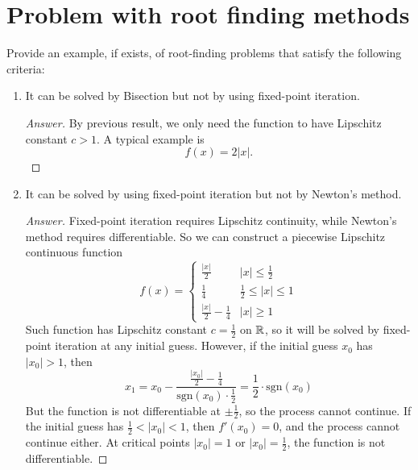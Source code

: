 


\section{Problem with root finding methods}
Provide an example, if exists, of root-finding problems that satisfy the following criteria:
\begin{enumerate}
	\item It can be solved by Bisection but not by using fixed-point iteration.
	\begin{proof}[Answer]
		By previous result, we only need the function to have Lipschitz constant \(c>1\).
		A typical example is
		\[ f(x)=2|x|. \]
	\end{proof}
	\item It can be solved by using fixed-point iteration but not by Newton's method.
	\begin{proof}[Answer]
		Fixed-point iteration requires Lipschitz continuity, while Newton's method requires differentiable.
		So we can construct a piecewise Lipschitz continuous function
		\[ f(x)=\begin{cases}
		\frac{\left| x\right| }{2} & |x|\leq \frac{1}{2} \\
		\frac{1}{4} &  \frac{1}{2}\leq |x| \leq 1 \\
		\frac{\left| x\right| }{2}-\frac{1}{4} & |x|\geq 1
		\end{cases} \]
		Such function has Lipschitz constant \(c=\frac{1}{2}\) on \(\mathbb{R}\), so it will be solved by fixed-point iteration at any initial guess.
		However, if the initial guess \(x_0\) has \(|x_0|>1\), then
		\[ x_1=x_0-\frac{\frac{|x_0|}{2}-\frac{1}{4}}{\text{sgn}{(x_0)}\cdot\frac{1}{2}}=\frac{1}{2}\cdot\text{sgn}{(x_0)} \]
		But the function is not differentiable at \(\pm\frac{1}{2}\), so the process cannot continue.
		If the initial guess has \(\frac{1}{2}<|x_0|<1\), then \(f'(x_0)=0\), and the process cannot continue either.
		At critical points \(|x_0|=1\) or \(|x_0|=\frac{1}{2}\), the function is not differentiable.
	\end{proof}
\end{enumerate}


